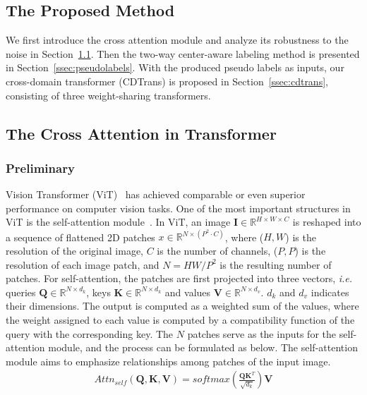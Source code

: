 \documentclass[dvipsnames, svgnames, x11names, table]{article} \usepackage{iclr2022_conference,times}
\def\mI{{\bm{I}}}
\def\mK{{\bm{K}}}
\def\mQ{{\bm{Q}}}
\def\mV{{\bm{V}}}
\begin{document}
\begin{spacing}{1.0}
\section{The Proposed Method}
We first introduce the cross attention module and analyze its robustness to the noise in Section~\ref{ssec:crossattn}. Then the two-way center-aware labeling method is presented in Section~\ref{ssec:pseudolabels}. With the produced pseudo labels as inputs, our cross-domain transformer (CDTrans) is proposed in Section~\ref{ssec:cdtrans}, consisting of three weight-sharing transformers.

\subsection{The Cross Attention in Transformer}
\label{ssec:crossattn}
\subsubsection{Preliminary}
Vision Transformer (ViT)~\citep{dosovitskiy2020image} has achieved comparable or even superior performance on computer vision tasks. One of the most important structures in ViT is the self-attention module~\citep{vaswani2017attention}. In ViT, an image $\mI\in \mathbb{R}^{H\times W\times C}$ is reshaped into a sequence of flattened 2D patches $x\in \mathbb{R}^{N\times (P^2\cdot C)}$, where ($H,W$) is the resolution of the original image, $C$ is the number of channels, ($P,P$) is the resolution of each image patch, and $N=HW/P^2$ is the resulting number of patches. For self-attention, the patches are first projected into three vectors, \textit{i.e.} queries $\mQ\in \mathbb{R}^{N\times d_k}$, keys $\mK\in \mathbb{R}^{N\times d_k}$ and values $\mV\in \mathbb{R}^{N\times d_v}$. $d_k$ and $d_v$ indicates their dimensions.
The output is computed as a weighted sum of the values, where the weight assigned to each value is computed by a compatibility function of the query with the corresponding key. The $N$ patches serve as the inputs for the self-attention module, and the process can be formulated as below. The self-attention module aims to emphasize relationships among patches of the input image.
\begin{gather}
Attn_{self}(\mQ,\mK,\mV)=softmax(\frac{\mQ\mK^T}{\sqrt{d_k}})\mV
\label{eq:selfattn}
\end{gather}




\end{spacing}
\end{document}
